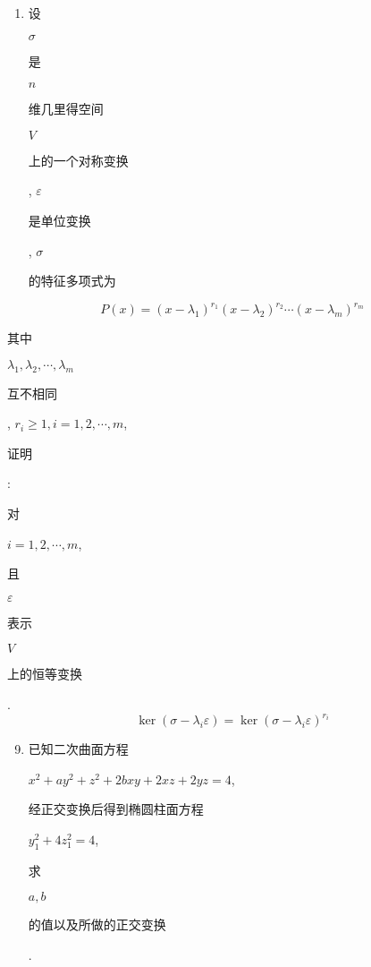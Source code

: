 \documentclass[10pt]{article}
\begin{document}
\begin{enumerate}
  \item \begin{CJK}{UTF8}{mj}设\end{CJK} $\sigma$ \begin{CJK}{UTF8}{mj}是\end{CJK} $n$ \begin{CJK}{UTF8}{mj}维几里得空间\end{CJK} $V$ \begin{CJK}{UTF8}{mj}上的一个对称变换\end{CJK}, $\varepsilon$ \begin{CJK}{UTF8}{mj}是单位变换\end{CJK}, $\sigma$ \begin{CJK}{UTF8}{mj}的特征多项式为\end{CJK}

\end{enumerate}
$$
P(x)=\left(x-\lambda_{1}\right)^{r_{1}}\left(x-\lambda_{2}\right)^{r_{2}} \cdots\left(x-\lambda_{m}\right)^{r_{m}}
$$
\begin{CJK}{UTF8}{mj}其中\end{CJK} $\lambda_{1}, \lambda_{2}, \cdots, \lambda_{m}$ \begin{CJK}{UTF8}{mj}互不相同\end{CJK}, $r_{i} \geq 1, i=1,2, \cdots, m$, \begin{CJK}{UTF8}{mj}证明\end{CJK}: \begin{CJK}{UTF8}{mj}对\end{CJK} $i=1,2, \cdots, m$, \begin{CJK}{UTF8}{mj}且\end{CJK} $\varepsilon$ \begin{CJK}{UTF8}{mj}表示\end{CJK} $V$ \begin{CJK}{UTF8}{mj}上的恒等变换\end{CJK}.
$$
\operatorname{ker}\left(\sigma-\lambda_{i} \varepsilon\right)=\operatorname{ker}\left(\sigma-\lambda_{i} \varepsilon\right)^{r_{i}}
$$

\begin{enumerate}
  \setcounter{enumi}{8}
  \item \begin{CJK}{UTF8}{mj}已知二次曲面方程\end{CJK} $x^{2}+a y^{2}+z^{2}+2 b x y+2 x z+2 y z=4$, \begin{CJK}{UTF8}{mj}经正交变换后得到椭圆柱面方程\end{CJK} $y_{1}^{2}+4 z_{1}^{2}=4$, \begin{CJK}{UTF8}{mj}求\end{CJK} $a, b$ \begin{CJK}{UTF8}{mj}的值以及所做的正交变换\end{CJK}.
\end{enumerate}
\end{document}
